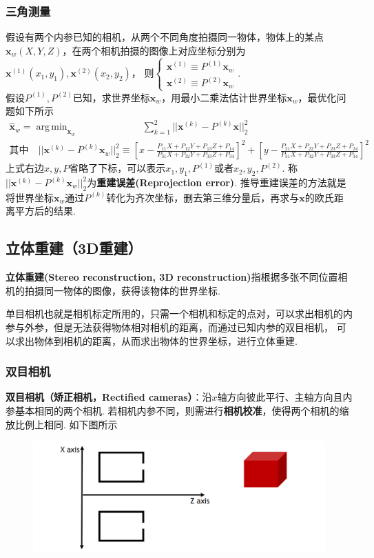 \documentclass[12pt, a4paper, oneside]{ctexart}
\numberwithin{equation}{section}  %
\theoremstyle{definition}
\DeclareMathOperator*{\argmin}{arg\,min}  %
\def\bd{\boldsymbol}        %
\def\del{\vspace{-1.5ex}}   %
\begin{document}
\subsubsection{三角测量}
假设有两个内参已知的相机，从两个不同角度拍摄同一物体，物体上的某点$\bd{x}_w(X,Y,Z)$，在两个相机拍摄的图像上对应坐标分别为$\bd{x}^{(1)}(x_1,y_1),\bd{x}^{(2)}(x_2,y_2)$，
则$\begin{cases}
    \bd{x}^{(1)} \equiv P^{(1)}\bd{x}_{w}\\
    \bd{x}^{(2)} \equiv P^{(2)}\bd{x}_{w}
\end{cases}$. \\
假设$P^{(1)},P^{(2)}$已知，求世界坐标$\bd{x}_{w}$，用最小二乘法估计世界坐标$\bd{x}_w$，最优化问题如下所示
\begin{align*}
    \hat{\bd{x}}_{w} = \argmin_{\bd{x}_w}&\ \quad\sum_{k=1}^2||\bd{x}^{(k)}-P^{(k)}\bd{x}||_2^2\\
    \text{其中}\quad ||\bd{x}^{(k)}-P^{(k)}\bd{x}_w||_2^2 \equiv&\ \left[x - \frac{P_{11}X+P_{12}Y+P_{13}Z+P_{14}}{P_{31}X+P_{32}Y+P_{33}Z+P_{34}}\right]^2 + 
    \left[y - \frac{P_{21}X+P_{22}Y+P_{23}Z+P_{24}}{P_{31}X+P_{32}Y+P_{33}Z+P_{34}}\right]^2
\end{align*}
上式右边$x,y,P$省略了下标，可以表示$x_1,y_1,P^{(1)}$或者$x_2,y_2,P^{(2)}$. 称$||\bd{x}^{(k)}-P^{(k)}\bd{x}_w||_2^2$为\textbf{重建误差(Reprojection error)}.
推导重建误差的方法就是将世界坐标$\bd{x}_w$通过$P^{(k)}$转化为齐次坐标，删去第三维分量后，再求与$\bd{x}$的欧氏距离平方后的结果.

\subsection{立体重建（3D重建）}
\textbf{立体重建(Stereo reconstruction, 3D reconstruction)}指根据多张不同位置相机的拍摄同一物体的图像，获得该物体的世界坐标.

单目相机也就是相机标定所用的，只需一个相机和标定的点对，可以求出相机的内参与外参，但是无法获得物体相对相机的距离，而通过已知内参的双目相机，
可以求出物体到相机的距离，从而求出物体的世界坐标，进行立体重建.

\subsubsection{双目相机}
\textbf{双目相机（矫正相机，Rectified cameras）}：沿$x$轴方向彼此平行、主轴方向且内参基本相同的两个相机. 
若相机内参不同，则需进行\textbf{相机校准}，使得两个相机的缩放比例上相同. 如下图所示\del\del
\begin{figure}[htbp]
    \centering
    \includegraphics[scale=0.5]{双目相机.png}
\end{figure}
\end{document}
